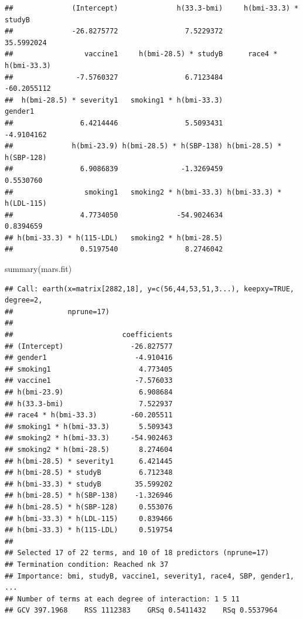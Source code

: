 \documentclass[
]{article}
\newenvironment{Shaded}{\begin{snugshade}}{\end{snugshade}}
\newcommand{\FunctionTok}[1]{\textcolor[rgb]{0.00,0.00,0.00}{#1}}
\newcommand{\NormalTok}[1]{#1}
\begin{document}
\begin{verbatim}
##              (Intercept)              h(33.3-bmi)     h(bmi-33.3) * studyB 
##              -26.8275772                7.5229372               35.5992024 
##                 vaccine1     h(bmi-28.5) * studyB      race4 * h(bmi-33.3) 
##               -7.5760327                6.7123484              -60.2055112 
##  h(bmi-28.5) * severity1   smoking1 * h(bmi-33.3)                  gender1 
##                6.4214446                5.5093431               -4.9104162 
##              h(bmi-23.9) h(bmi-28.5) * h(SBP-138) h(bmi-28.5) * h(SBP-128) 
##                6.9086839               -1.3269459                0.5530760 
##                 smoking1   smoking2 * h(bmi-33.3) h(bmi-33.3) * h(LDL-115) 
##                4.7734050              -54.9024634                0.8394659 
## h(bmi-33.3) * h(115-LDL)   smoking2 * h(bmi-28.5) 
##                0.5197540                8.2746042
\end{verbatim}

\begin{Shaded}
\begin{Highlighting}[]
\FunctionTok{summary}\NormalTok{(mars.fit)}
\end{Highlighting}
\end{Shaded}

\begin{verbatim}
## Call: earth(x=matrix[2882,18], y=c(56,44,53,51,3...), keepxy=TRUE, degree=2,
##             nprune=17)
## 
##                          coefficients
## (Intercept)                -26.827577
## gender1                     -4.910416
## smoking1                     4.773405
## vaccine1                    -7.576033
## h(bmi-23.9)                  6.908684
## h(33.3-bmi)                  7.522937
## race4 * h(bmi-33.3)        -60.205511
## smoking1 * h(bmi-33.3)       5.509343
## smoking2 * h(bmi-33.3)     -54.902463
## smoking2 * h(bmi-28.5)       8.274604
## h(bmi-28.5) * severity1      6.421445
## h(bmi-28.5) * studyB         6.712348
## h(bmi-33.3) * studyB        35.599202
## h(bmi-28.5) * h(SBP-138)    -1.326946
## h(bmi-28.5) * h(SBP-128)     0.553076
## h(bmi-33.3) * h(LDL-115)     0.839466
## h(bmi-33.3) * h(115-LDL)     0.519754
## 
## Selected 17 of 22 terms, and 10 of 18 predictors (nprune=17)
## Termination condition: Reached nk 37
## Importance: bmi, studyB, vaccine1, severity1, race4, SBP, gender1, ...
## Number of terms at each degree of interaction: 1 5 11
## GCV 397.1968    RSS 1112383    GRSq 0.5411432    RSq 0.5537964
\end{verbatim}
\end{document}
